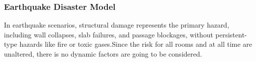 \subsubsection{Earthquake Disaster Model}
In earthquake scenarios, structural damage represents the primary hazard, including wall collapses, slab failures, and passage blockages, without persistent-type hazards like fire or toxic gases.Since the risk for all rooms and at all time are unaltered, there is no dynamic factors are going to be considered.